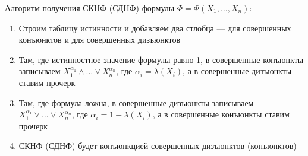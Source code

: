 \underline{Алгоритм получения СКНФ (СДНФ)} формулы $\Phi = \Phi(X_1, \dots, X_n)$:
\begin{enumerate}
    \item Строим таблицу истинности и добавляем два стлобца --- для совершенных конъюнктов и для совершенных дизъюнктов
    \item Там, где истинностное значение формулы равно 1, в совершенные конъюнкты записываем $X_1^{\alpha_1} \land \dots \lor X_n^{\alpha_n}$, где $\alpha_i = \lambda(X_i)$, а в совершенные дизъюнкты ставим прочерк
    \item Там, где формула ложна, в совершенные дизъюнкты записываем $X_1^{\alpha_1} \lor \dots \lor X_n^{\alpha_n}$, где $\alpha_i = 1-\lambda(X_i)$, а в совершенные конъюнкты ставим прочерк
    \item СКНФ (СДНФ) будет конъюнкцией совершенных дизъюнктов (конъюнктов)
\end{enumerate}
